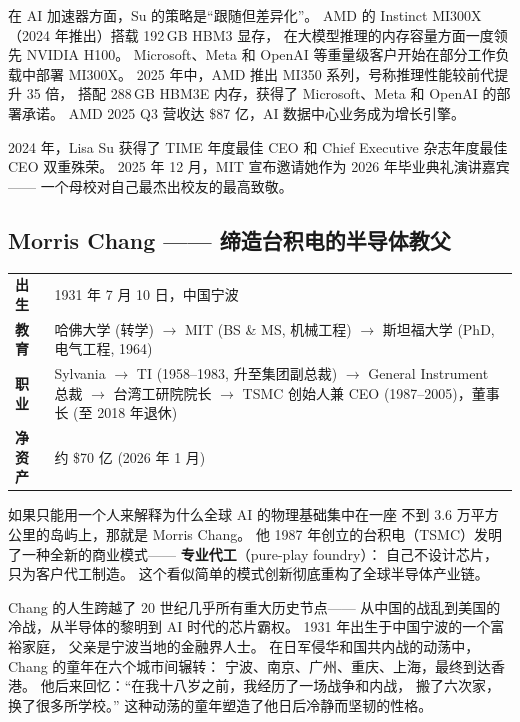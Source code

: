在 AI 加速器方面，Su 的策略是``跟随但差异化''。
AMD 的 Instinct MI300X（2024 年推出）搭载 192\,GB HBM3 显存，
在大模型推理的内存容量方面一度领先 NVIDIA H100。
Microsoft、Meta 和 OpenAI 等重量级客户开始在部分工作负载中部署 MI300X。
2025 年中，AMD 推出 MI350 系列，号称推理性能较前代提升 35 倍，
搭配 288\,GB HBM3E 内存，获得了 Microsoft、Meta 和 OpenAI 的部署承诺。
AMD 2025 Q3 营收达 \$87 亿，AI 数据中心业务成为增长引擎。

2024 年，Lisa Su 获得了 TIME 年度最佳 CEO 和
Chief Executive 杂志年度最佳 CEO 双重殊荣。
2025 年 12 月，MIT 宣布邀请她作为 2026 年毕业典礼演讲嘉宾——
一个母校对自己最杰出校友的最高致敬。

\subsection{Morris Chang —— 缔造台积电的半导体教父}
\label{subsec:morris-chang}

\begin{keybox}
\small
\begin{tabularx}{\textwidth}{lX}
\toprule
\textbf{出生} & 1931 年 7 月 10 日，中国宁波 \\
\textbf{教育} & 哈佛大学 (转学) $\to$ MIT (BS \& MS, 机械工程) $\to$
                斯坦福大学 (PhD, 电气工程, 1964) \\
\textbf{职业} & Sylvania $\to$ TI (1958--1983, 升至集团副总裁) $\to$
                General Instrument 总裁 $\to$ 台湾工研院院长 $\to$
                TSMC 创始人兼 CEO (1987--2005)，董事长 (至 2018 年退休) \\
\textbf{净资产} & 约 \$70 亿 (2026 年 1 月) \\
\bottomrule
\end{tabularx}
\end{keybox}

如果只能用一个人来解释为什么全球 AI 的物理基础集中在一座
不到 3.6 万平方公里的岛屿上，那就是 Morris Chang。
他 1987 年创立的台积电（TSMC）发明了一种全新的商业模式——
\textbf{专业代工}（pure-play foundry）：
自己不设计芯片，只为客户代工制造。
这个看似简单的模式创新彻底重构了全球半导体产业链。

Chang 的人生跨越了 20 世纪几乎所有重大历史节点——
从中国的战乱到美国的冷战，从半导体的黎明到 AI 时代的芯片霸权。
1931 年出生于中国宁波的一个富裕家庭，
父亲是宁波当地的金融界人士。
在日军侵华和国共内战的动荡中，
Chang 的童年在六个城市间辗转：
宁波、南京、广州、重庆、上海，最终到达香港。
他后来回忆：``在我十八岁之前，我经历了一场战争和内战，
搬了六次家，换了很多所学校。''
这种动荡的童年塑造了他日后冷静而坚韧的性格。

